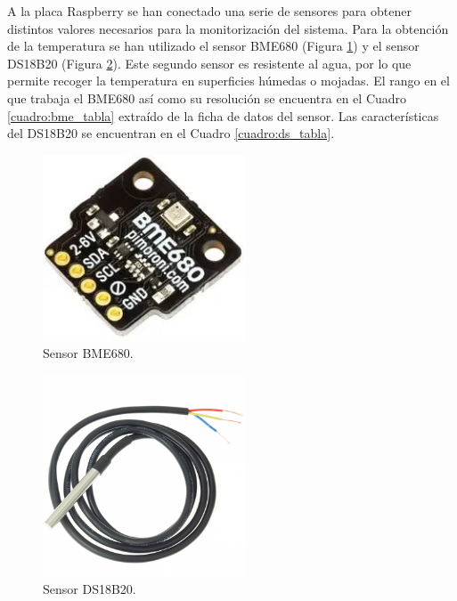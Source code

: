 A la placa Raspberry se han conectado una serie de sensores para obtener distintos valores necesarios para la monitorización del sistema. Para la obtención de la temperatura se han utilizado el sensor BME680 (Figura \ref{fig:bme_of}) y el sensor DS18B20 (Figura \ref{fig:ds_of}). Este segundo sensor es resistente al agua, por lo que permite recoger la temperatura en superficies húmedas o mojadas. El rango en el que trabaja el BME680 así como su resolución se encuentra en el Cuadro \ref{cuadro:bme_tabla} extraído de la ficha de datos del sensor. Las características del DS18B20 se encuentran en el Cuadro \ref{cuadro:ds_tabla}.\\
\begin{figure} [h!]
  \begin{center}
    \includegraphics[width=6cm]{figs/bme_of}
  \end{center}
  \caption{Sensor BME680.}
  \label{fig:bme_of}
\end{figure}

\begin{figure} [h!]
  \begin{center}
    \includegraphics[width=6cm]{figs/ds_of}
  \end{center}
  \caption{Sensor DS18B20.}
  \label{fig:ds_of}
\end{figure}

